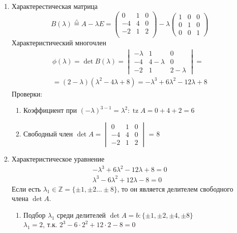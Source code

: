 \documentclass{article}
\DeclareMathOperator*{\Tz}{tz}
\begin{document}
\begin{enumerate}
	\item Характерестическая матрица
	\[
		B(\lambda) \stackrel{\triangle}{=} A - \lambda E = \begin{pmatrix}
			0 & 1 & 0 \\
			-4 & 4 & 0 \\
			-2 & 1 & 2 \\
		\end{pmatrix} - \lambda \begin{pmatrix}
			1 & 0 & 0 \\
			0 & 1 & 0 \\
			0 & 0 & 1
		\end{pmatrix}
	\]
	Характеристический многочлен
	\begin{gather*}
		\phi (\lambda) = \det B(\lambda) = \begin{vmatrix}
			-\lambda & 1 & 0 \\
			-4 & 4 - \lambda & 0 \\
			-2 & 1 & 2 - \lambda
		\end{vmatrix} = \\
		= (2 - \lambda)(\lambda^2 - 4\lambda + 8) = -\lambda^3 + 6\lambda^2 - 12\lambda + 8
	\end{gather*}
	Проверки: \begin{enumerate}
		\item Коэффициент при $(-\lambda)^{3-1} = \lambda^2 : \Tz A = 0 + 4 + 2 = 6$
		\item Свободный член $\det A = \begin{vmatrix}
			0 & 1 & 0 \\
			-4 & 4 & 0 \\
			-2 & 1 & 2
		\end{vmatrix}$ = 8
	\end{enumerate}
	\item Характеристическое уравнение
	\begin{gather*}
		-\lambda^3 + 6\lambda^2 - 12\lambda + 8 = 0 \\
		\lambda^3 - 6\lambda^2 + 12\lambda - 8 = 0
	\end{gather*}
	Если есть $\lambda_1 \in \mathbb{Z} = \{ \pm 1, \pm 2 \dots \pm 8 \}$,
	то он является делителем свободного члена $\det A$.
	\begin{enumerate}
		\item Подбор $\lambda_1$ среди делителей $\det A = b : \{\pm 1, \pm 2, \pm 4, \pm 8 \}$ \\
		$\lambda_1 = 2$, т.к. $2^3 - 6 \cdot 2^2 + 12 \cdot 2 - 8 = 0$

\end{enumerate}
\end{enumerate}
\end{document}
